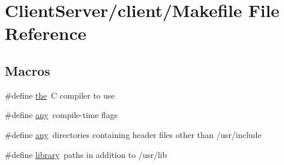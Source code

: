 \hypertarget{ClientServer_2client_2Makefile}{\section{Client\-Server/client/\-Makefile File Reference}
\label{ClientServer_2client_2Makefile}
}
\subsection*{Macros}
\begin{DoxyCompactItemize}
\item 
\#define \hyperlink{ClientServer_2client_2Makefile_a09c6b60bb7451f9136e25140ffdff6bd}{the}~C compiler to use
\item 
\#define \hyperlink{ClientServer_2client_2Makefile_a6120b6f1abea66c8ede7b300a66d4cc0}{any}~compile-\/time flags
\item 
\#define \hyperlink{ClientServer_2client_2Makefile_a6120b6f1abea66c8ede7b300a66d4cc0}{any}~directories containing header files other than /usr/include
\item 
\#define \hyperlink{ClientServer_2client_2Makefile_a1f477410360bd4832116581b9934ab71}{library}~paths in addition to /usr/lib
\end{DoxyCompactItemize}


